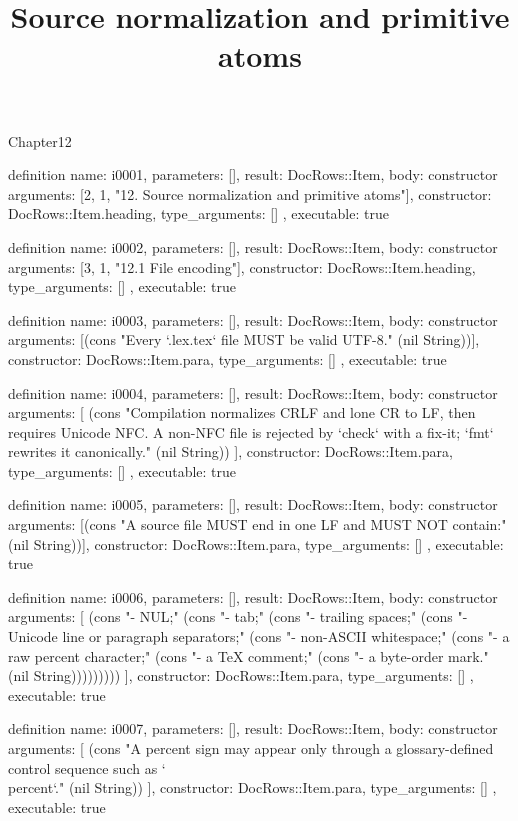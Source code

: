 \begin{lexlean}{Chapter12}
\title{Source normalization and primitive atoms}
\begin{semanticmodule}
definition{
  name: i0001,
  parameters: [],
  result: DocRows::Item,
  body: constructor{
    arguments: [2, 1, "12. Source normalization and primitive atoms"],
    constructor: DocRows::Item.heading,
    type_arguments: []
  },
  executable: true
}

definition{
  name: i0002,
  parameters: [],
  result: DocRows::Item,
  body: constructor{
    arguments: [3, 1, "12.1 File encoding"],
    constructor: DocRows::Item.heading,
    type_arguments: []
  },
  executable: true
}

definition{
  name: i0003,
  parameters: [],
  result: DocRows::Item,
  body: constructor{
    arguments: [(cons "Every `.lex.tex` file MUST be valid UTF-8." (nil String))],
    constructor: DocRows::Item.para,
    type_arguments: []
  },
  executable: true
}

definition{
  name: i0004,
  parameters: [],
  result: DocRows::Item,
  body: constructor{
    arguments: [
      (cons "Compilation normalizes CRLF and lone CR to LF, then requires Unicode NFC. A non-NFC file is rejected by `check` with a fix-it; `fmt` rewrites it canonically." (nil String))
    ],
    constructor: DocRows::Item.para,
    type_arguments: []
  },
  executable: true
}

definition{
  name: i0005,
  parameters: [],
  result: DocRows::Item,
  body: constructor{
    arguments: [(cons "A source file MUST end in one LF and MUST NOT contain:" (nil String))],
    constructor: DocRows::Item.para,
    type_arguments: []
  },
  executable: true
}

definition{
  name: i0006,
  parameters: [],
  result: DocRows::Item,
  body: constructor{
    arguments: [
      (cons "- NUL;" (cons "- tab;" (cons "- trailing spaces;" (cons "- Unicode line or paragraph separators;" (cons "- non-ASCII whitespace;" (cons "- a raw percent character;" (cons "- a TeX comment;" (cons "- a byte-order mark." (nil String)))))))))
    ],
    constructor: DocRows::Item.para,
    type_arguments: []
  },
  executable: true
}

definition{
  name: i0007,
  parameters: [],
  result: DocRows::Item,
  body: constructor{
    arguments: [
      (cons "A percent sign may appear only through a glossary-defined control sequence such as `\\percent`." (nil String))
    ],
    constructor: DocRows::Item.para,
    type_arguments: []
  },
  executable: true
}


\end{semanticmodule}
\end{lexlean}
